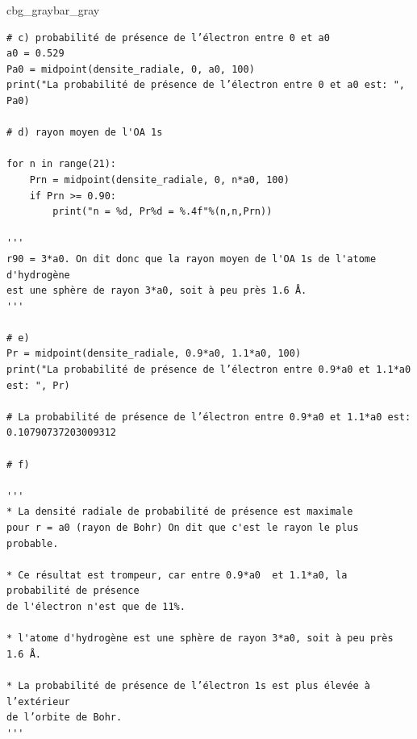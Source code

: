 \documentclass[%
oneside,                 %
final,                   %
10pt,french]{article}
\newenvironment{_pro_tight}[2]{
   \def\FrameCommand{\color{#2}\vrule width 1mm\normalcolor\colorbox{#1}}
   \FrameRule0.6pt\MakeFramed {\advance\hsize-2mm\FrameRestore}\vskip3mm}
   {\vskip0mm\endMakeFramed}
\newenvironment{pro}[2]{
\bgroup\rmfamily
\fboxsep=0mm\relax
\begin{_pro_tight}{#1}{#2}
\list{}{\parsep=-2mm\parskip=0mm\topsep=0pt\leftmargin=2mm
\rightmargin=2\leftmargin\leftmargin=4pt\relax}
\item\relax}
{\endlist\end{_pro_tight}\egroup}
\newenvironment{doconceexercise}{}{}
\begin{document}
\begin{doconceexercise}
\begin{pro}{cbg_gray}{bar_gray}
\begin{verbatim}
# c) probabilité de présence de l’électron entre 0 et a0
a0 = 0.529
Pa0 = midpoint(densite_radiale, 0, a0, 100)
print("La probabilité de présence de l’électron entre 0 et a0 est: ", Pa0)

# d) rayon moyen de l'OA 1s

for n in range(21):
    Prn = midpoint(densite_radiale, 0, n*a0, 100)
    if Prn >= 0.90:
        print("n = %d, Pr%d = %.4f"%(n,n,Prn))
    
'''
r90 = 3*a0. On dit donc que la rayon moyen de l'OA 1s de l'atome d'hydrogène 
est une sphère de rayon 3*a0, soit à peu près 1.6 Å.
'''

# e)
Pr = midpoint(densite_radiale, 0.9*a0, 1.1*a0, 100)
print("La probabilité de présence de l’électron entre 0.9*a0 et 1.1*a0 est: ", Pr)

# La probabilité de présence de l’électron entre 0.9*a0 et 1.1*a0 est:  0.10790737203009312

# f)

'''
* La densité radiale de probabilité de présence est maximale 
pour r = a0 (rayon de Bohr) On dit que c'est le rayon le plus probable.

* Ce résultat est trompeur, car entre 0.9*a0  et 1.1*a0, la probabilité de présence
de l'électron n'est que de 11%.

* l'atome d'hydrogène est une sphère de rayon 3*a0, soit à peu près 1.6 Å.

* La probabilité de présence de l’électron 1s est plus élevée à l’extérieur 
de l’orbite de Bohr. 
'''
\end{verbatim}
\end{pro}
\noindent


\end{doconceexercise}



\end{document}
